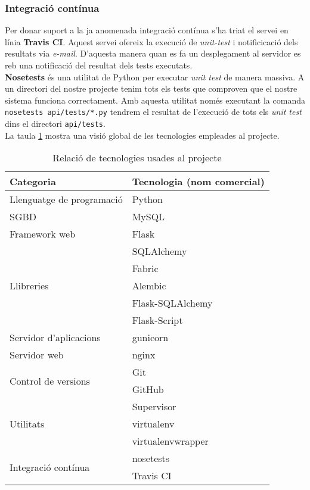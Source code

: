 	\subsubsection{Integració contínua}

	Per donar suport a la ja anomenada integració contínua s'ha triat el servei en línia \textbf{Travis CI}. \cite{travis_ci} Aquest servei ofereix la execució de \emph{unit-test} i notificicació dels resultats via \emph{e-mail}. D'aquesta manera quan es fa un desplegament al servidor es reb una notificació del resultat dels tests executats.\\
	
	\textbf{Nosetests} \cite{nose} és una utilitat de Python per executar \emph{unit test} de manera massiva. A un directori del nostre projecte tenim tots els tests que comproven que el nostre sistema funciona correctament. Amb aquesta utilitat només executant la comanda \texttt{nosetests api/tests/*.py} tendrem el resultat de l'execució de tots els \emph{unit test} dins el directori \texttt{api/tests}.\\
	
	La taula \ref{table:tecnologies} mostra una visió global de les tecnologies empleades al projecte.

\begin{table}[here]
 	\begin{center}
 		\begin{tabularx}{\textwidth}{|l|X|}
  			\hline
 			\bfseries Categoria & \bfseries Tecnologia (nom comercial) \\ \hline
			Llenguatge de programació &  Python \\ \hline
			\ac{SGBD} & MySQL \\ \hline
			Framework web & Flask\\ \hline
			\multirow{5}{*}{Llibreries} & SQLAlchemy  \\
 & Fabric \\
 & Alembic \\
 & Flask-SQLAlchemy \\
 & Flask-Script\\ \hline
 Servidor d'aplicacions & gunicorn \\ \hline
 Servidor web & nginx \\ \hline
\multirow{2}{*}{Control de versions} & Git \\ & GitHub \\ \hline
\multirow{3}{*}{Utilitats} & Supervisor \\ & virtualenv \\ & virtualenvwrapper\\ \hline
\multirow{2}{*}{Integració contínua} & nosetests \\ & Travis CI \\ \hline
		\end{tabularx}
	\end{center}
	\label{table:tecnologies}
	\caption{Relació de tecnologies usades al projecte} 
\end{table}